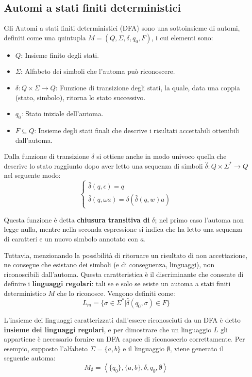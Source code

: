 \subsection{Automi a stati finiti deterministici}
Gli Automi a stati finiti deterministici (DFA) sono una sottoinsieme di automi, definiti come una quintupla $M = (Q, \Sigma, \delta, q_0, F)$, i cui
elementi sono: \begin{itemize}
    \item $Q$: Insieme finito degli stati.
    \item $\Sigma$: Alfabeto dei simboli che l'automa può riconoscere.
    \item $\delta:Q\times\Sigma \to Q$: Funzione di transizione degli stati, la quale, data una coppia (stato, simbolo), ritorna lo stato successivo.
    \item $q_0$: Stato iniziale dell'automa.
    \item $F\subseteq Q$: Insieme degli stati finali che descrive i risultati accettabili ottenibili dall'automa.
\end{itemize}

\noindent Dalla funzione di transizione $\delta$ si ottiene anche in modo univoco quella che descrive lo stato raggiunto dopo aver letto una sequenza di
simboli $\hat{\delta}:Q \times \Sigma^* \to Q$ nel seguente modo: \[ \begin{cases}
		\hat{\delta}(q,\epsilon) = q\\
		\hat{\delta}(q, \omega a) = \delta(\hat{\delta}(q,w)a)
\end{cases} \]

\noindent Questa funzione è detta \textbf{chiusura transitiva di} $\delta$; nel primo caso l'automa non legge nulla, mentre nella seconda espressione si
indica che ha letto una sequenza di caratteri e un nuovo simbolo annotato con $a$.\par
Tuttavia, menzionando la possibilità di ritornare un risultato di non accettazione, ne consegue che esistano dei simboli (e di conseguenza, linguaggi),
non riconoscibili dall'automa. Questa caratteristica è il discriminante che consente di definire i \textbf{linguaggi regolari}: tali se e solo se esiste
un automa a stati finiti deterministico $M$ che lo riconosce. Vengono definiti come: \[
    L_m = \{\sigma\in \Sigma^* | \hat{\delta}(q_0, \sigma)\in F\}
\]

\noindent L'insieme dei linguaggi caratterizzati dall'essere riconosciuti da un DFA è detto \textbf{insieme dei linguaggi regolari}, e per dimostrare
che un linguaggio $L$ gli appartiene è necessario fornire un DFA capace di riconoscerlo correttamente. Per esempio, supposto l'alfabeto $\Sigma =
\{a, b\}$ e il linguaggio $\emptyset$, viene generato il seguente automa: \[
    M_{\emptyset} = \left<\{q_0\}, \{a, b\}, \delta, q_0, \emptyset\right>
\]

